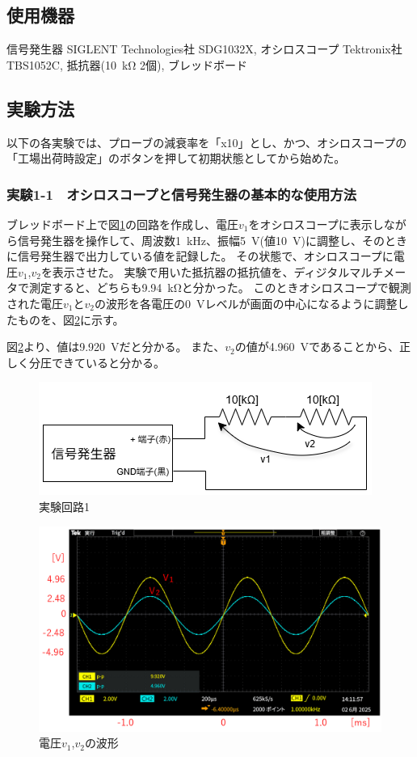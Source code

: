 \documentclass[uplatex, a4j, dvipdfmx]{jsarticle}
\begin{document}
\subsection{使用機器}
\noindent
信号発生器 SIGLENT Technologies社 SDG1032X, オシロスコープ Tektronix社 TBS1052C,
抵抗器(\SI{10}{\kilo\ohm} 2個), ブレッドボード

\subsection{実験方法}
以下の各実験では、プローブの減衰率を「x10」とし、かつ、オシロスコープの「工場出荷時設定」のボタンを押して初期状態としてから始めた。

\subsubsection*{実験1-1　オシロスコープと信号発生器の基本的な使用方法}
ブレッドボード上で図\ref{E1}の回路を作成し、電圧$v_1$をオシロスコープに表示しながら信号発生器を操作して、周波数\SI{1}{\kilo\hertz}、振幅\SI{5}{\volt}(値\SI{10}{\volt})に調整し、そのときに信号発生器で出力している値を記録した。
その状態で、オシロスコープに電圧$v_1$,$v_2$を表示させた。
実験で用いた抵抗器の抵抗値を、ディジタルマルチメータで測定すると、どちらも\SI{9.94}{\kilo\ohm}と分かった。
このときオシロスコープで観測された電圧$v_1$と$v_2$の波形を各電圧の\SI{0}{\volt}レベルが画面の中心になるように調整したものを、図\ref{O1}に示す。

図\ref{O1}より、値は\SI{9.920}{\volt}だと分かる。
また、$v_2$の値が\SI{4.960}{\volt}であることから、正しく分圧できていると分かる。
\begin{figure}[htbp]
    \centering
    \includegraphics[width=0.7\linewidth]{picture/E1.png}
    \caption{実験回路1}
    \label{E1}
\end{figure}

\begin{figure}[htbp]
    \centering
    \includegraphics[width=0.8\linewidth]{picture/O1.png}
    \caption{電圧$v_1$,$v_2$の波形}
    \label{O1}
\end{figure}
\end{document}
